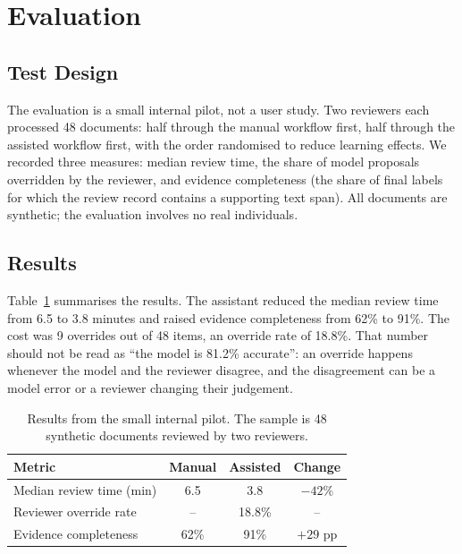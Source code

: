 \section{Evaluation}
\label{sec:evaluation}

\subsection{Test Design}
\label{sec:test-design}

The evaluation is a small internal pilot, not a user study. Two reviewers each processed 48
documents: half through the manual workflow first, half through the assisted workflow first,
with the order randomised to reduce learning effects. We recorded three measures: median
review time, the share of model proposals overridden by the reviewer, and evidence
completeness (the share of final labels for which the review record contains a supporting
text span). All documents are synthetic; the evaluation involves no real individuals.

\subsection{Results}
\label{sec:results}

Table~\ref{tab:results} summarises the results. The assistant reduced the median review time
from 6.5 to 3.8 minutes and raised evidence completeness from 62\% to 91\%. The cost was 9
overrides out of 48 items, an override rate of 18.8\%. That number should not be read as
``the model is 81.2\% accurate'': an override happens whenever the model and the reviewer
disagree, and the disagreement can be a model error or a reviewer changing their judgement.

\begin{table}[htbp]
  \centering
  \begin{tabular}{lccc}
    \toprule
    Metric & Manual & Assisted & Change \\
    \midrule
    Median review time (min) & 6.5 & 3.8 & $-42\%$ \\
    Reviewer override rate & -- & 18.8\% & -- \\
    Evidence completeness & 62\% & 91\% & $+29$ pp \\
    \bottomrule
  \end{tabular}
  \caption{Results from the small internal pilot. The sample is 48 synthetic documents
  reviewed by two reviewers.}
  \label{tab:results}
\end{table}

